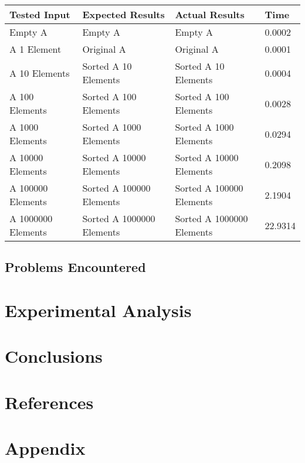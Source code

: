 \documentclass[onecolumn, 12pt, article]{IEEEtran}
\numberwithin{case}{problem}
\numberwithin{condition}{problem}
\numberwithin{condition}{subsection}
\numberwithin{definition}{section}
\theoremstyle{remark}
\numberwithin{question}{problem}
\theoremstyle{plain}
\numberwithin{answer}{problem}
\numberwithin{solution}{section}
\numberwithin{equation}{section}%
\begin{document}
\begin{center}
\begin{tabular}{|l|l|l|l|}
\hline Tested Input & Expected Results & Actual Results & Time \\
\hline Empty A & Empty A & Empty A & 0.0002 \\
\hline A 1 Element & Original A & Original A & 0.0001 \\
\hline A 10 Elements & Sorted A 10 Elements & Sorted A 10 Elements & 0.0004 \\
\hline A 100 Elements & Sorted A 100 Elements & Sorted A 100 Elements & 0.0028 \\
\hline A 1000 Elements & Sorted A 1000 Elements & Sorted A 1000 Elements & 0.0294 \\
\hline A 10000 Elements & Sorted A 10000 Elements & Sorted A 10000 Elements & 0.2098 \\
\hline A 100000 Elements & Sorted A 100000 Elements & Sorted A 100000 Elements & 2.1904 \\
\hline A 1000000 Elements & Sorted A 1000000 Elements & Sorted A 1000000 Elements & 22.9314 \\
\hline 
\hline
\end{tabular}
\end{center}
\subsection{Problems Encountered}


\section{Experimental Analysis}


\section{Conclusions}


\newpage

 \section*{References}



\newpage

\section*{Appendix}


\end{document}
